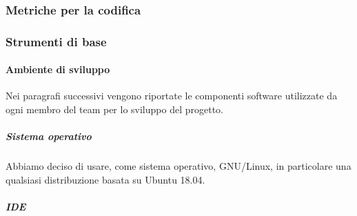         
        \subsubsection{Metriche per la codifica} %
        

        \subsubsection{Strumenti di base}\label{PP:Sviluppo:Strumenti}

	    \paragraph{Ambiente di sviluppo}\label{PP:Sviluppo:Strumenti:AmbienteSviluppo}
	    Nei paragrafi successivi vengono riportate le componenti software utilizzate da ogni membro del team per lo sviluppo del progetto.


	    \subparagraph{Sistema operativo}\label{PP:Sviluppo:Strumenti:AmbienteSviluppo:SistemaOperativo}
	    Abbiamo deciso di usare, come sistema operativo, GNU/Linux, in particolare una qualsiasi distribuzione basata su Ubuntu 18.04.
	    
	    \subparagraph{IDE} %
